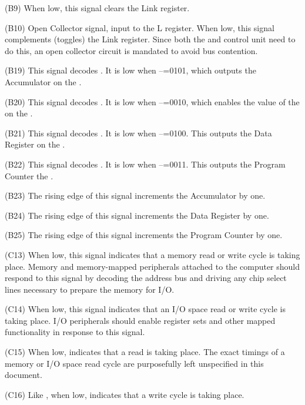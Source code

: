 \begin{description}
\item{\bfseries \CLL} (B9) When low, this signal clears the Link register.
\item{\bfseries \CPL} (B10) Open Collector signal, input to the L register. When low,
  this signal complements (toggles) the Link register. Since both the \ALU{}
  and control unit need to do this, an open collector circuit is mandated to
  avoid bus contention.
\item{\bfseries \RAC} (B19) This signal decodes \RUNITn{}. It is low when
  –=\textsf{0101}, which outputs the \gls{Accumulator} on the
  \IBUS.
\item{\bfseries \RAGL} (B20) This signal decodes \RUNITn{}. It is low when
  –=\textsf{0010}, which enables the value of the \AGL{} on
  the \IBUS.
\item{\bfseries \RDR} (B21) This signal decodes \RUNITn{}. It is low when
  –=\textsf{0100}. This outputs the Data Register on the
  \IBUS.
\item{\bfseries \RPC} (B22) This signal decodes \RUNITn{}. It is low when
  –=\textsf{0011}. This outputs the Program Counter the
  \IBUS.
\item{\bfseries \INCAC} (B23) The rising edge of this signal increments the
  \gls{Accumulator} by one.
\item{\bfseries \INCDR} (B24) The rising edge of this signal increments the Data
  Register by one.
\item{\bfseries \INCPC} (B25) The rising edge of this signal increments the Program
  Counter by one.
\item{\bfseries \MEM} (C13) When low, this signal indicates that a memory read or
  write cycle is taking place. Memory and memory-mapped peripherals attached to
  the computer should respond to this signal by decoding the address bus and
  driving any chip select lines necessary to prepare the memory for I/O.
\item{\bfseries \IO} (C14) When low, this signal indicates that an I/O space read or
  write cycle is taking place. I/O peripherals should enable register sets and
  other mapped functionality in response to this signal.
\item{\bfseries \READ} (C15) When low, indicates that a read is taking place. The
  exact timings of a memory or I/O space read cycle are purposefully left
  unspecified in this document.
\item{\bfseries \WRITE} (C16) Like \READ, when low, indicates that a write cycle is
  taking place.
\end{description}

